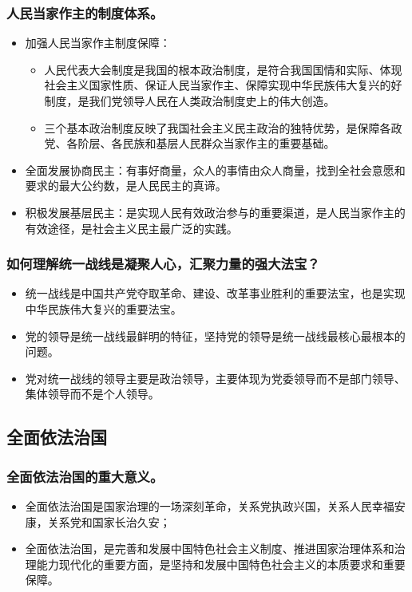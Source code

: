 \documentclass{article}
\begin{document}
\subsubsection{人民当家作主的制度体系。}
\begin{itemize}
    \item 加强人民当家作主制度保障：
    \begin{itemize}
        \item 人民代表大会制度是我国的根本政治制度，是符合我国国情和实际、体现社会主义国家性质、保证人民当家作主、保障实现中华民族伟大复兴的好制度，是我们党领导人民在人类政治制度史上的伟大创造。
        \item 三个基本政治制度反映了我国社会主义民主政治的独特优势，是保障各政党、各阶层、各民族和基层人民群众当家作主的重要基础。
    \end{itemize}
    \item 全面发展协商民主：有事好商量，众人的事情由众人商量，找到全社会意愿和要求的最大公约数，是人民民主的真谛。
    \item 积极发展基层民主：是实现人民有效政治参与的重要渠道，是人民当家作主的有效途径，是社会主义民主最广泛的实践。
\end{itemize}

\subsubsection{如何理解统一战线是凝聚人心，汇聚力量的强大法宝？}
\begin{itemize}
    \item 统一战线是中国共产党夺取革命、建设、改革事业胜利的重要法宝，也是实现中华民族伟大复兴的重要法宝。
    \item 党的领导是统一战线最鲜明的特征，坚持党的领导是统一战线最核心最根本的问题。
    \item 党对统一战线的领导主要是政治领导，主要体现为党委领导而不是部门领导、集体领导而不是个人领导。
\end{itemize}

\subsection{全面依法治国}

\subsubsection{全面依法治国的重大意义。}
\begin{itemize}
    \item 全面依法治国是国家治理的一场深刻革命，关系党执政兴国，关系人民幸福安康，关系党和国家长治久安；
    \item 全面依法治国，是完善和发展中国特色社会主义制度、推进国家治理体系和治理能力现代化的重要方面，是坚持和发展中国特色社会主义的本质要求和重要保障。
\end{itemize}
\end{document}
